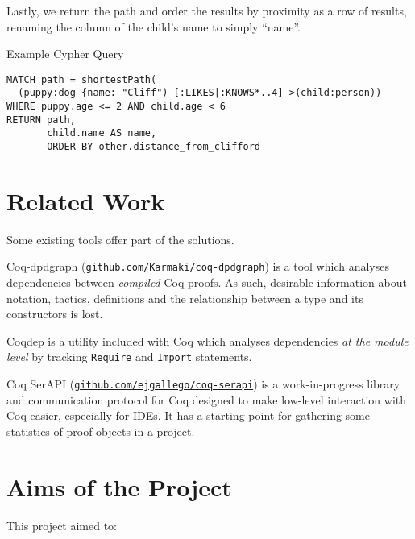 Lastly, we return the path and order the results by proximity as a row of
results, renaming the column of the child's name to simply ``name''.

\begin{listing}[tb]

  \caption{Example Cypher Query}
  \label{lst:cypherexample}

  \begin{verbatim}
MATCH path = shortestPath(
  (puppy:dog {name: "Cliff")-[:LIKES|:KNOWS*..4]->(child:person))
WHERE puppy.age <= 2 AND child.age < 6
RETURN path,
       child.name AS name,
       ORDER BY other.distance_from_clifford
  \end{verbatim}

\end{listing}

\section{Related Work}

Some existing tools offer part of the solutions.

Coq-dpdgraph
(\href{http://github.com/Karmaki/coq-dpdgraph}{\texttt{github.com/Karmaki/coq-dpdgraph}})
is a tool which analyses dependencies between \emph{compiled} Coq proofs. As
such, desirable information about notation, tactics, definitions and the
relationship between a type and its constructors is lost.

Coqdep is a utility included with Coq which analyses dependencies \emph{at the
module level} by tracking {\tt Require} and {\tt Import} statements.

Coq SerAPI
(\href{http://github.com/ejgallego/coq-serapi}{\texttt{github.com/ejgallego/coq-serapi}})
is a work-in-progress library and communication protocol for Coq designed to
make low-level interaction with Coq easier, especially for IDEs. It has a
starting point for gathering some statistics of proof-objects in a project.

\section{Aims of the Project}
\label{intro:aims}

This project aimed to:


